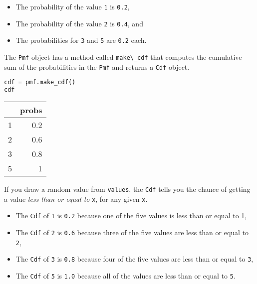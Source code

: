 \begin{itemize}
\item
  The probability of the value \passthrough{\lstinline!1!} is
  \passthrough{\lstinline!0.2!},
\item
  The probability of the value \passthrough{\lstinline!2!} is
  \passthrough{\lstinline!0.4!}, and
\item
  The probabilities for \passthrough{\lstinline!3!} and
  \passthrough{\lstinline!5!} are \passthrough{\lstinline!0.2!} each.
\end{itemize}

The \passthrough{\lstinline!Pmf!} object has a method called
\passthrough{\lstinline!make\_cdf!} that computes the cumulative sum of
the probabilities in the \passthrough{\lstinline!Pmf!} and returns a
\passthrough{\lstinline!Cdf!} object.

\begin{lstlisting}[language=Python,style=source]
cdf = pmf.make_cdf()
cdf
\end{lstlisting}

\begin{tabular}{lr}
\toprule
 & probs \\
\midrule
1 & 0.2 \\
2 & 0.6 \\
3 & 0.8 \\
5 & 1 \\
\bottomrule
\end{tabular}

If you draw a random value from \passthrough{\lstinline!values!}, the
\passthrough{\lstinline!Cdf!} tells you the chance of getting a value
\emph{less than or equal to} \passthrough{\lstinline!x!}, for any given
\passthrough{\lstinline!x!}.

\begin{itemize}
\item
  The \passthrough{\lstinline!Cdf!} of \passthrough{\lstinline!1!} is
  \passthrough{\lstinline!0.2!} because one of the five values is less
  than or equal to 1,
\item
  The \passthrough{\lstinline!Cdf!} of \passthrough{\lstinline!2!} is
  \passthrough{\lstinline!0.6!} because three of the five values are
  less than or equal to \passthrough{\lstinline!2!},
\item
  The \passthrough{\lstinline!Cdf!} of \passthrough{\lstinline!3!} is
  \passthrough{\lstinline!0.8!} because four of the five values are less
  than or equal to \passthrough{\lstinline!3!},
\item
  The \passthrough{\lstinline!Cdf!} of \passthrough{\lstinline!5!} is
  \passthrough{\lstinline!1.0!} because all of the values are less than
  or equal to \passthrough{\lstinline!5!}.
\end{itemize}

